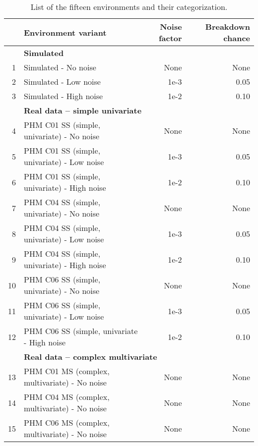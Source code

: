 \documentclass[referee, sn-mathphys-num]{sn-jnl}
\newcommand{\rowspace}[1]{\renewcommand{\arraystretch}{#1}}
\begin{document}
	\begin{table}
		\rowspace{1.3}
		\caption{List of the fifteen environments and their categorization.}\label{tbl_ListEnvironments}
		{\begin{tabular}{@{}r l rr@{}} \arrayrulecolor{black!40}\toprule 
				& Environment variant & Noise factor & Breakdown chance \\ \midrule
				& \multicolumn{3}{l}{\textbf{Simulated}}\\
				1 & Simulated - No noise  & None & None \\
				2 & Simulated - Low noise & 1e-3 & 0.05 \\
				3 & Simulated  - High noise & 1e-2 & 0.10 \\ \midrule
				\rule{0pt}{1.5\normalbaselineskip}
				& \multicolumn{3}{l}{\textbf{Real data -- simple univariate}} \\
				4 & PHM C01 SS (simple, univariate) - No noise & None & None \\
				5 & PHM C01 SS (simple, univariate) - Low noise & 1e-3 & 0.05 \\
				6 & PHM C01 SS (simple, univariate) - High noise & 1e-2 & 0.10 \\ \hdashline
				
				7 & PHM C04 SS (simple, univariate) - No noise & None & None \\
				8 & PHM C04 SS (simple, univariate) - Low noise & 1e-3 & 0.05 \\
				9 & PHM C04 SS (simple, univariate) - High noise & 1e-2 & 0.10 \\ \hdashline
				
				10 & PHM C06 SS (simple, univariate) - No noise & None & None \\
				11 & PHM C06 SS (simple, univariate) - Low noise & 1e-3 & 0.05 \\
				12 & PHM C06 SS (simple, univariate - High noise & 1e-2 & 0.10 \\ \midrule
				
				\rule{0pt}{1.5\normalbaselineskip}
				& \multicolumn{3}{l}{\textbf{Real data -- complex multivariate}}\\
				13 & PHM C01 MS (complex, multivariate) - No noise & None & None \\
				14 & PHM C04 MS (complex, multivariate) - No noise & None & None \\
				15 & PHM C06 MS (complex, multivariate) - No noise & None & None \\ \bottomrule
		\end{tabular}}
		
	\end{table}
	
\end{document}
